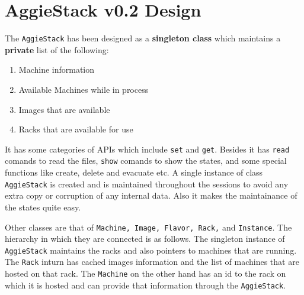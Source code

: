 \documentclass[letterpaper]{article}
\begin{document}

\newpage

\section{AggieStack v0.2 Design}

The \texttt{AggieStack} has been designed as a \textbf{singleton class} which maintains a \textbf{private} list of the following: 

\begin{enumerate}
	\item Machine information
	\item Available Machines while in process
	\item Images that are available
	\item Racks that are available for use
\end{enumerate}

It has some categories of APIs which include \texttt{set} and \texttt{get}. Besides it has \texttt{read} comands to read the files, \texttt{show} comands to show the states, and some special functions like create, delete and evacuate etc. A single instance of class \texttt{AggieStack} is created and is maintained throughout the sessions to avoid any extra copy or corruption of any internal data. Also it makes the maintainance of the states quite easy. 

Other classes are that of \texttt{Machine, Image, Flavor, Rack,} and \texttt{Instance}. The hierarchy in which they are connected is as follows. The singleton instance of \texttt{AggieStack} maintains the racks and also pointers to machines that are running. The \texttt{Rack} inturn has cached images information and the list of machines that are hosted on that rack. The \texttt{Machine} on the other hand has an id to the rack on which it is hosted and can provide that information through the \texttt{AggieStack}. 
\end{document}
